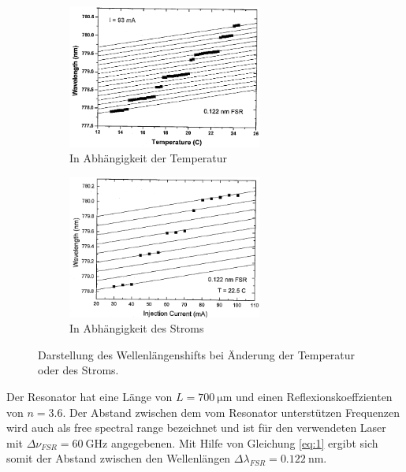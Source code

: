 \begin{figure}
\centering
\begin{subfigure}{.5\textwidth}
	\centering
	\includegraphics[width=0.7\textwidth]{ressources/Temp.png}
	\caption{In Abhängigkeit der Temperatur}
	\label{fig:Theorie1}
\end{subfigure}%
\begin{subfigure}{.5\textwidth}
	\centering
	\includegraphics[width=0.7\textwidth]{ressources/Strom.png}
	\caption{In Abhängigkeit des Stroms}
	\label{fig:Theorie2}
\end{subfigure}
\caption{Darstellung des Wellenlängenshifts bei Änderung der Temperatur oder des Stroms. \cite{skript}}
\label{fig:theo4}
\end{figure}


Der Resonator hat eine Länge von $L=\SI{700}{\micro\meter}$ und einen Reflexionskoeffzienten von $n=3.6$. Der Abstand zwischen dem vom Resonator unterstützen Frequenzen wird auch als free spectral range bezeichnet und ist für den verwendeten Laser mit $\Delta\nu_{FSR}=\SI{60}{\giga\hertz}$ angegebenen. Mit Hilfe von Gleichung \ref{eq:1} ergibt sich somit der Abstand zwischen den Wellenlängen $\Delta\lambda_{FSR}=\SI{0.122}{\nano\meter}$.

